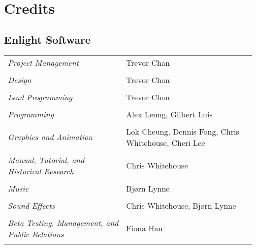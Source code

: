 
\chapter{Credits}

\section{Enlight Software}

\begin{tabular}{p{2in} p{2in}}
    \textit{Project Management} & Trevor Chan \\ \\
    \textit{Design} & Trevor Chan \\ \\
    \textit{Lead Programming} & Trevor Chan \\ \\
    \textit{Programming} & Alex Leung, Gilbert Luis \\ \\
    \textit{Graphics and Animation} & Lok Cheung, Dennis Fong, Chris Whitehouse, Cheri Lee \\ \\
    \textit{Manual, Tutorial, and Historical Research} & Chris Whitehouse \\ \\
    \textit{Music} & Bjørn Lynne \\ \\
    \textit{Sound Effects} & Chris Whitehouse, Bjørn Lynne \\ \\
    \textit{Beta Testing, Management, and Public Relations} & Fiona Hau \\ \\
\end{tabular}

